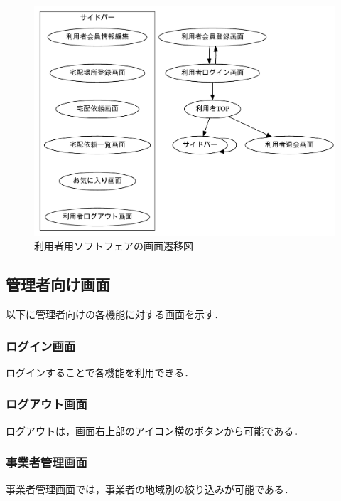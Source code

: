 \documentclass[a4paper, titlepage]{jsarticle}
\begin{document}
\begin{figure}[H]
  \centering
  \includegraphics[width=\linewidth]{other/user.pdf}
  \caption{利用者用ソフトフェアの画面遷移図}
  \label{fig:user_diagram}
\end{figure}

\clearpage
\subsection{管理者向け画面}
以下に管理者向けの各機能に対する画面を示す．
\subsubsection{ログイン画面}
ログインすることで各機能を利用できる．
\clearpage
\subsubsection{ログアウト画面}
ログアウトは，画面右上部のアイコン横のボタンから可能である．
\clearpage
\subsubsection{事業者管理画面}
事業者管理画面では，事業者の地域別の絞り込みが可能である．
\clearpage
\end{document}
